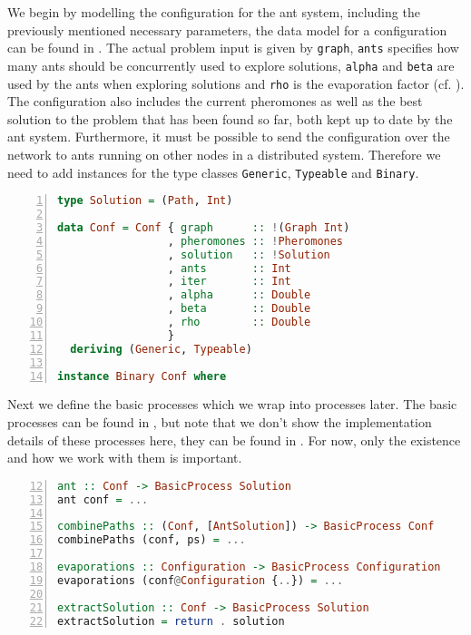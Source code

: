 We begin by modelling the configuration for the ant system, including the previously mentioned necessary parameters, the data model for a configuration can be found in . The actual problem input is given by \texttt{graph}, \texttt{ants} specifies how many ants should be concurrently used to explore solutions, \texttt{alpha} and \texttt{beta} are used by the ants when exploring solutions and \texttt{rho} is the evaporation factor (cf. ). The configuration also includes the current pheromones as well as the best solution to the problem that has been found so far, both kept up to date by the ant system. Furthermore, it must be possible to send the configuration over the network to ants running on other nodes in a distributed system. Therefore we need to add instances for the type classes \texttt{Generic}, \texttt{Typeable} and \texttt{Binary}.

\begin{lstlisting}[language=Haskell,frame=tb,numbers=left,label=lst:ant_conf,caption=Configuration for the ant system.]
type Solution = (Path, Int)

data Conf = Conf { graph      :: !(Graph Int)
                 , pheromones :: !Pheromones
                 , solution   :: !Solution
                 , ants       :: Int
                 , iter       :: Int
                 , alpha      :: Double
                 , beta       :: Double
                 , rho        :: Double
                 }
  deriving (Generic, Typeable)

instance Binary Conf where
\end{lstlisting}

Next we define the basic processes which we wrap into processes later. The basic processes can be found in , but note that we don't show the implementation details of these processes here, they can be found in . For now, only the existence and how we work with them is important.

\begin{lstlisting}[language=Haskell,frame=tb,numbers=left,firstnumber=12,label=lst:ant_basic,caption=Basic processes.]
ant :: Conf -> BasicProcess Solution
ant conf = ...

combinePaths :: (Conf, [AntSolution]) -> BasicProcess Conf
combinePaths (conf, ps) = ...

evaporations :: Configuration -> BasicProcess Configuration
evaporations (conf@Configuration {..}) = ...

extractSolution :: Conf -> BasicProcess Solution
extractSolution = return . solution
\end{lstlisting}

